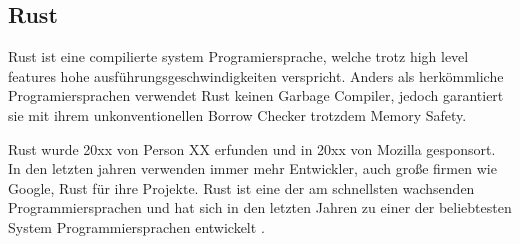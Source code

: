 \subsection{Rust}

Rust ist eine compilierte system Programiersprache, welche trotz high level features hohe ausführungsgeschwindigkeiten verspricht. Anders als herkömmliche Programiersprachen verwendet Rust keinen Garbage Compiler, jedoch garantiert sie mit ihrem unkonventionellen Borrow Checker trotzdem Memory Safety.


Rust wurde 20xx von Person XX erfunden und in 20xx von Mozilla gesponsort. In den letzten jahren verwenden immer mehr Entwickler, auch große firmen wie Google, Rust für ihre Projekte. Rust ist eine der am schnellsten wachsenden Programmiersprachen und hat sich in den letzten Jahren zu einer der beliebtesten System Programmiersprachen entwickelt \cite{stackoverflow_survey}.


